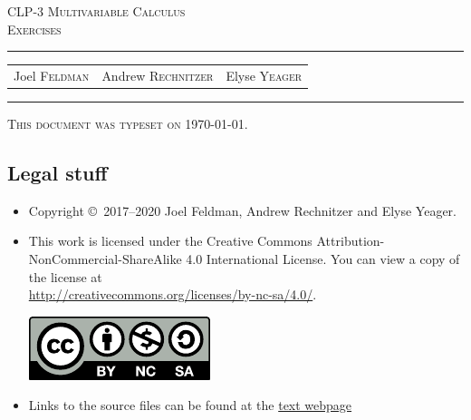 \documentclass[12pt,letterpaper, openany]{book}
\makeatletter
\newcommand{\reqnomode}{\tagsleft@false}
\makeatother
\begin{document}
\reqnomode

\setcounter{page}{0}

\begin{titlepage} 
\begin{center} 
\textsc{\LARGE
CLP-3 Multivariable Calculus\\[2ex]
Exercises
}\\[2ex]

\vspace{5ex}
\hrule
\vspace{5ex}

\begin{tabular}{ccc}
\large  Joel \textsc{Feldman}  
& \large \qquad Andrew \textsc{Rechnitzer} 
&\large  \qquad Elyse \textsc{Yeager}
\end{tabular}

\end{center}
\vspace{2ex}
\hrule

\vfill
\textsc{This document was typeset on \today.}
\end{titlepage}

\subsection*{Legal stuff}
\begin{itemize}
 \item Copyright \copyright\ 2017--2020 Joel Feldman, Andrew Rechnitzer and Elyse Yeager.
\item This work is licensed under the
Creative Commons Attribution-NonCommercial-ShareAlike 4.0 International
License. You can view a copy of the license at \\
\url{http://creativecommons.org/licenses/by-nc-sa/4.0/}.
\begin{center}
 \includegraphics{by-nc-sa.pdf}
\end{center}
\item Links to the source files can be found at the \href{http://www.math.ubc.ca/~CLP/index.html}{text webpage}
\end{itemize}
\newpage
\end{document}
